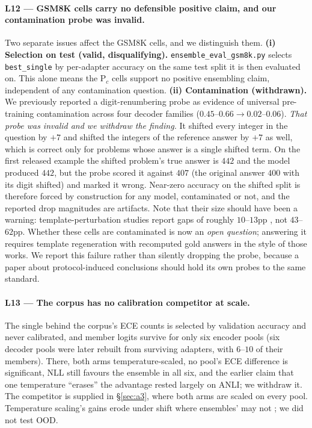 \documentclass[11pt]{article}
\begin{document}
\paragraph{L12 — GSM8K cells carry no defensible positive claim, and our contamination probe was invalid.} Two separate issues affect the GSM8K cells, and we distinguish them. \textbf{(i) Selection on test (valid, disqualifying).} \texttt{ensemble\_\allowbreak eval\_\allowbreak gsm8k.\allowbreak py} selects \texttt{best\_single} by per-adapter accuracy on the same test split it is then evaluated on. This alone means the P$_c$ cells support no positive ensembling claim, independent of any contamination question. \textbf{(ii) Contamination (withdrawn).} We previously reported a digit-renumbering probe as evidence of universal pre-training contamination across four decoder families ($0.45$--$0.66 \to 0.02$--$0.06$). \emph{That probe was invalid and we withdraw the finding.} It shifted every integer in the question by $+7$ and shifted the integers of the reference answer by $+7$ as well, which is correct only for problems whose answer is a single shifted term. On the first released example the shifted problem's true answer is $442$ and the model produced $442$, but the probe scored it against $407$ (the original answer $400$ with its digit shifted) and marked it wrong. Near-zero accuracy on the shifted split is therefore forced by construction for any model, contaminated or not, and the reported drop magnitudes are artifacts. Note that their size should have been a warning: template-perturbation studies report gaps of roughly $10$--$13$pp \citep{mirzadeh2024gsmsymbolic, zhang2024gsm1k}, not $43$--$62$pp. Whether these cells are contaminated is now an \emph{open question}; answering it requires template regeneration with recomputed gold answers in the style of those works. We report this failure rather than silently dropping the probe, because a paper about protocol-induced conclusions should hold its own probes to the same standard.

\paragraph{L13 — The corpus has no calibration competitor at scale.} The single behind the corpus's ECE counts is selected by validation accuracy and never calibrated, and member logits survive for only six encoder pools (six decoder pools were later rebuilt from surviving adapters, with $6$--$10$ of their members). There, both arms temperature-scaled, no pool's ECE difference is significant, NLL still favours the ensemble in all six, and the earlier claim that one temperature ``erases'' the advantage rested largely on ANLI; we withdraw it. The competitor is supplied in \S\ref{sec:a3}, where both arms are scaled on every pool. Temperature scaling's gains erode under shift where ensembles' may not \citep{ovadia2019trust}; we did not test OOD.
\end{document}
